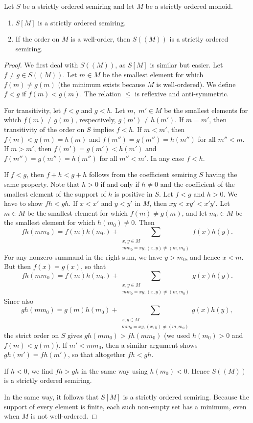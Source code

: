 \documentclass[10pt,a4paper]{amsart}
\newcommand{\hmnser}[2]{{#1}(\!({#2})\!)}
\begin{document}
\begin{proposition} \label{p:semiring-order}\mbox{}
  Let $S$ be a strictly ordered semiring and let $M$ be a strictly ordered monoid.
  \begin{enumerate}
    \item $S[M]$ is a strictly ordered semiring.
    \item If the order on $M$ is a well-order, then $\hmnser{S}{M}$ is a strictly ordered semiring.
  \end{enumerate}
\end{proposition}

\begin{proof}
  We first deal with $\hmnser{S}{M}$, as $S[M]$ is similar but easier.
  Let $f \ne g \in \hmnser{S}{M}$.
  Let $m \in M$ be the smallest element for which $f(m) \ne g(m)$ (the minimum exists because $M$ is well-ordered).
  We define $f < g$ if  $f(m) < g(m)$.
  The relation $\le$ is reflexive and anti-symmetric.

  For transitivity, let $f < g$ and $g < h$. Let $m$,~$m' \in M$ be the smallest elements for which $f(m) \ne g(m)$, respectively, $g(m') \ne h(m')$.
  If $m=m'$, then transitivity of the order on $S$ implies $f <h$.
  If $m < m'$, then $f(m) < g(m) = h(m)$ and $f(m'')=g(m'')=h(m'')$ for all $m'' < m$.
  If $m > m'$, then $f(m')=g(m')<h(m')$ and $f(m'')=g(m'')=h(m'')$ for all $m'' < m'$.
  In any case $f < h$.

  If $f < g$, then $f+h < g+h$ follows from the coefficient semiring $S$ having the same property.
  Note that $h > 0$ if and only if $h \ne 0$ and the coefficient of the smallest element of the support of $h$ is positive in $S$.
  Let $f < g$ and $h> 0$. We have to show $fh < gh$.
  If $x < x'$ and $y < y'$ in $M$, then $xy < xy' < x'y'$.
  Let $m \in M$ be the smallest element for which $f(m) \ne g(m)$, and let $m_0 \in M$ be the smallest element for which $h(m_0) \ne 0$.
  Then
  \[
  fh(mm_0) = f(m)h(m_0) + \sum_{\substack{x,y \in M \\ mm_0=xy,  (x,y) \ne (m,m_0)}} f(x)h(y).
  \]
  For any nonzero summand in the right sum, we have $y > m_0$, and hence $x < m$.
  But then $f(x)=g(x)$, so that
  \[
  fh(mm_0) =  f(m)h(m_0) + \sum_{\substack{x,y \in M \\ mm_0=xy,  (x,y) \ne (m,m_0)}} g(x)h(y).
  \]
  Since also
  \[
  gh(mm_0) =  g(m)h(m_0) + \sum_{\substack{x,y \in M \\ mm_0=xy,  (x,y) \ne (m,m_0)}} g(x)h(y),
  \]
  the strict order on $S$ gives $gh(mm_0) > fh(mm_0)$ (we used $h(m_0) > 0$ and $f(m) < g(m)$).
  If $m' < mm_0$, then a similar argument shows $gh(m')=fh(m')$, so that altogether $fh < gh$.

  If $h < 0$, we find $fh > gh$ in the same way using $h(m_0) < 0$.
  Hence $\hmnser{S}{M}$ is a strictly ordered semiring.

  In the same way, it follows that $S[M]$ is a strictly ordered semiring.
  Because the support of every element is finite, each such non-empty set has a minimum, even when $M$ is not well-ordered.
\end{proof}
\end{document}
